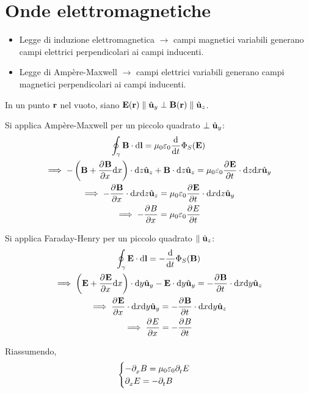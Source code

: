 \chapter{Onde elettromagnetiche}

\begin{itemize}
    \item Legge di induzione elettromagnetica $\to$ campi magnetici variabili generano campi elettrici perpendicolari ai campi inducenti.
    \item Legge di Ampère-Maxwell $\to$ campi elettrici variabili generano campi magnetici perpendicolari ai campi inducenti.
\end{itemize}

In un punto $\mathbf{r}$ nel vuoto, siano $\mathbf{E}(\mathbf{r}) \parallel \hat{\mathbf{u}}_{y} \perp \mathbf{B}(\mathbf{r}) \parallel \hat{\mathbf{u}}_{z}$.

Si applica Ampère-Maxwell per un piccolo quadrato $\perp \hat{\mathbf{u}}_{y}$:
\begin{equation}
\label{eq:ampere_maxwell_quadratino}
\begin{gathered}
    \oint_\gamma \B \lde
    = \mu_0\eps_0 \der{t} \Phi_S(\E) \\
    \implies
    -\pts{\B + \parder[\B]{x} \de x} \cdot \de z \uz + \B \cdot \de z \uz
    = \mu_0 \eps_0 \parder[\E]{t} \cdot \de z \de x \uy \\
    \implies
    - \parder[\B]{x} \cdot \de x \de z \uz
    = \mu_0 \eps_0 \parder[\E]{t} \cdot \de x \de z \uy \\
    \implies
    - \parder[B]{x} = \mu_0 \eps_0 \parder[E]{t}
\end{gathered}
\end{equation}

Si applica Faraday-Henry per un piccolo quadrato $\parallel \hat{\mathbf{u}}_{z}$:
\begin{equation}
\label{eq:faraday_henry_quadratino}
\begin{gathered}
    \oint_\gamma \E \lde
    = -\der{t} \Phi_S(\B) \\
    \implies
    \pts{\E + \parder[\E]{x} \de x} \cdot \de y \uy - \E \cdot \de y \uy
    = - \parder[\B]{t} \cdot \de x \de y \uz \\
    \implies
    \parder[\E]{x} \cdot \de x \de y \uy
    = - \parder[\B]{t} \cdot \de x \de y \uz \\
    \implies
    \parder[E]{x} = - \parder[B]{t}
\end{gathered}
\end{equation}

Riassumendo,
\begin{equation}
    \begin{cases}
        - \parder[B]{x} = \mu_0 \eps_0 \parder[E]{t} \\
        \parder[E]{x} = - \parder[B]{t}
    \end{cases}
\end{equation}

